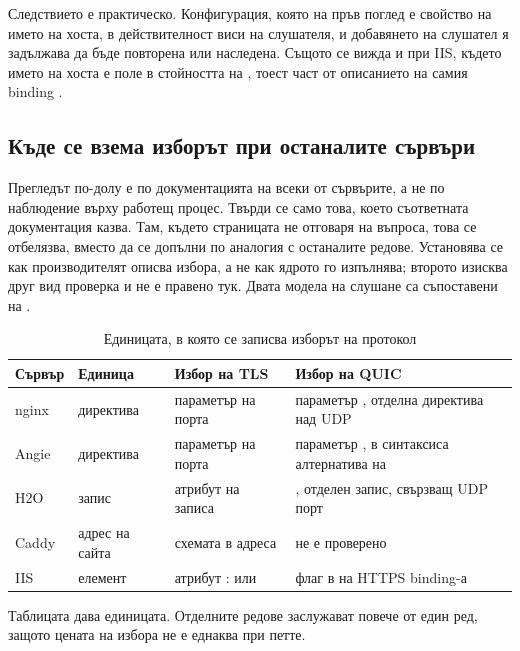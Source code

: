 Следствието е практическо. Конфигурация, която на пръв поглед е свойство на името на хоста, в
действителност виси на слушателя, и добавянето на слушател я задължава да бъде повторена или
наследена. Същото се вижда и при IIS, където името на хоста е поле в стойността на
, тоест част от описанието на самия binding \cite{iisbinding}.

\subsection{Къде се взема изборът при останалите сървъри}

Прегледът по-долу е по документацията на всеки от сървърите, а не по наблюдение върху
работещ процес. Твърди се само това, което съответната документация казва. Там, където
страницата не отговаря на въпроса, това се отбелязва, вместо да се допълни по аналогия с
останалите редове. Установява се как производителят описва избора, а не как ядрото го
изпълнява; второто изисква друг вид проверка и не е правено тук. Двата модела на слушане са съпоставени на .



\begin{table}[H]
\centering
\caption{Единицата, в която се записва изборът на протокол}
\label{tab:listener-models}
\begin{tabular}{@{}L{1.9cm}L{3.1cm}L{4.6cm}L{4.4cm}@{}}
\toprule
\textbf{Сървър} & \textbf{Единица} & \textbf{Избор на TLS} & \textbf{Избор на QUIC} \\
\midrule
nginx & директива  & параметър  на порта & параметър ,
отделна директива над UDP \\
Angie & директива  & параметър  на порта & параметър , в
синтаксиса алтернатива на  \\
H2O & запис  & атрибут  на записа & , отделен запис,
свързващ UDP порт \\
Caddy & адрес на сайта & схемата в адреса & не е проверено \\
IIS & елемент  & атрибут :  или  & флаг в
 на HTTPS binding-а \\
\bottomrule
\end{tabular}
\end{table}

Таблицата дава единицата. Отделните редове заслужават повече от един ред, защото цената на
избора не е еднаква при петте.

